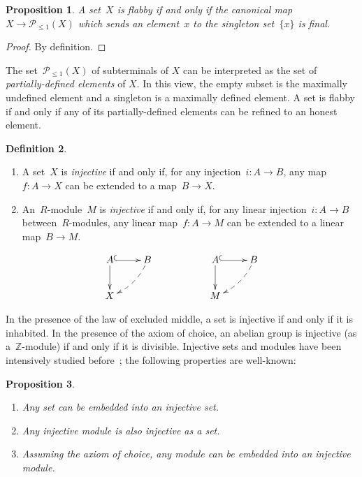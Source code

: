 \documentclass[oneside]{amsart}
\theoremstyle{definition}
\newtheorem{defn}{Definition}[section]
\theoremstyle{plain}
\newtheorem{prop}[defn]{Proposition}
\theoremstyle{remark}
\newcommand{\ZZ}{\mathbb{Z}}
\renewcommand{\P}{\mathcal{P}}
\renewcommand{\_}{\mathpunct{.}\,}
\begin{document}
\begin{prop}A set~$X$ is flabby if and only if the canonical map~$X \to
\P_{\leq 1}(X)$ which sends an element~$x$ to the singleton set~$\{x\}$ is
final.
\end{prop}

\begin{proof}By definition.\end{proof}

The set~$\P_{\leq 1}(X)$ of subterminals of $X$ can be interpreted as the set
of \emph{partially-defined elements} of $X$. In this view, the empty subset is
the maximally undefined element and a singleton is a maximally defined element.
A set is flabby if and only if any of its partially-defined elements can be
refined to an honest element.

\begin{defn}\begin{enumerate}
\item A set~$X$ is \emph{injective} if and only if, for any injection~$i
: A \to B$, any map~$f : A \to X$ can be extended to a map~$B \to X$.
\item An~$R$-module~$M$ is \emph{injective} if and only if, for any linear
injection~$i : A \to B$ between~$R$-modules, any linear map~$f : A \to M$ can
be extended to a linear map~$B \to M$.
\end{enumerate}
\[ \xymatrix{
  A \ar@{^{(}->}[r]\ar[d] & B \ar@{-->}@/^/[ld] &&
  A \ar@{^{(}->}[r]\ar[d] & B \ar@{-->}@/^/[ld] \\
  X &&& M
} \]
\end{defn}

In the presence of the law of excluded middle, a set is injective if and only
if it is inhabited. In the presence of the axiom of choice, an abelian group is
injective (as a~$\ZZ$-module) if and only if it is divisible. Injective sets
and modules have been intensively studied before~\cite{XXX}; the following
properties are well-known:

\begin{prop}\label{prop:basics-injective}
\begin{enumerate}
\item Any set can be embedded into an injective set.
\item Any injective module is also injective as a set.
\item Assuming the axiom of choice, any module can be embedded into an
injective module.
\end{enumerate}\end{prop}
\end{document}

